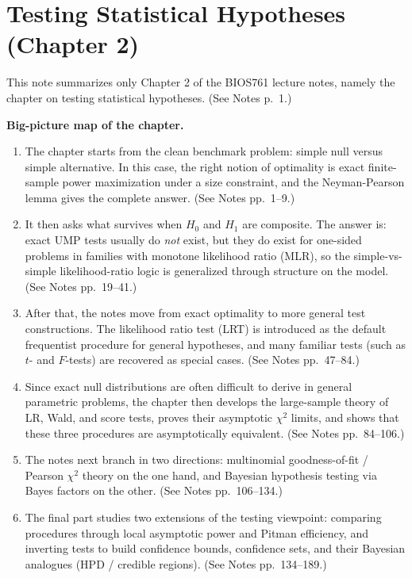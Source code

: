 \section{Testing Statistical Hypotheses (Chapter 2)}
This note summarizes only Chapter 2 of the BIOS761 lecture notes, namely the chapter on testing statistical hypotheses. (See Notes p.~1.)

\begin{block}
\textbf{Big-picture map of the chapter.}
\begin{enumerate}
    \item The chapter starts from the clean benchmark problem: simple null versus simple alternative. In this case, the right notion of optimality is exact finite-sample power maximization under a size constraint, and the Neyman-Pearson lemma gives the complete answer. (See Notes pp.~1--9.)
    \item It then asks what survives when $H_0$ and $H_1$ are composite. The answer is: exact UMP tests usually do \emph{not} exist, but they do exist for one-sided problems in families with monotone likelihood ratio (MLR), so the simple-vs-simple likelihood-ratio logic is generalized through structure on the model. (See Notes pp.~19--41.)
    \item After that, the notes move from exact optimality to more general test constructions. The likelihood ratio test (LRT) is introduced as the default frequentist procedure for general hypotheses, and many familiar tests (such as $t$- and $F$-tests) are recovered as special cases. (See Notes pp.~47--84.)
    \item Since exact null distributions are often difficult to derive in general parametric problems, the chapter then develops the large-sample theory of LR, Wald, and score tests, proves their asymptotic $\chi^2$ limits, and shows that these three procedures are asymptotically equivalent. (See Notes pp.~84--106.)
    \item The notes next branch in two directions: multinomial goodness-of-fit / Pearson $\chi^2$ theory on the one hand, and Bayesian hypothesis testing via Bayes factors on the other. (See Notes pp.~106--134.)
    \item The final part studies two extensions of the testing viewpoint: comparing procedures through local asymptotic power and Pitman efficiency, and inverting tests to build confidence bounds, confidence sets, and their Bayesian analogues (HPD / credible regions). (See Notes pp.~134--189.)
\end{enumerate}
\end{block}

